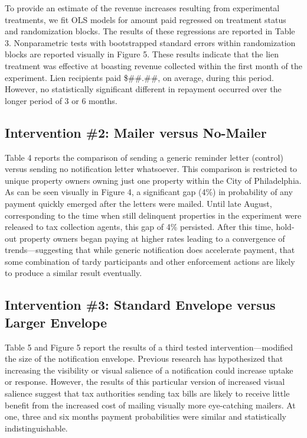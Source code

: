 \documentclass[12pt,titlepage]{article}
\begin{document}
To provide an estimate of the revenue increases resulting from experimental 
treatments, we fit OLS models for amount paid regressed on treatment status 
and randomization blocks. The results of these regressions are reported in 
Table 3. Nonparametric tests with bootstrapped standard errors within 
randomization blocks are reported visually in Figure 5. These results indicate 
that the lien treatment was effective at boasting revenue collected within the 
first month of the experiment. Lien recipients paid \$\#\#.\#\#, on average, 
during this period. However, no statistically significant different in 
repayment occurred over the longer period of 3 or 6 months.

\subsection{Intervention \#2: Mailer versus No-Mailer}

Table 4 reports the comparison of sending a generic reminder letter 
(control) versus sending no notification letter whatsoever. This 
comparison is restricted to unique property owners owning just one 
property within the City of Philadelphia. As can be seen visually in 
Figure 4, a significant gap (4\%) in probability of any payment quickly 
emerged after the letters were mailed. Until late August, corresponding
to the time when still delinquent properties in the experiment were 
released to tax collection agents, this gap of 4\% persisted. 
After this time, hold-out property owners began paying at higher rates 
leading to a convergence of trends—suggesting that while generic 
notification does accelerate payment, that some combination of tardy 
participants and other enforcement actions are likely to produce a 
similar result eventually. 

\subsection{Intervention \#3: Standard Envelope versus Larger Envelope}

Table 5 and Figure 5 report the results of a third tested
intervention—modified the size of the notification envelope.
Previous research has hypothesized that increasing the visibility or visual 
salience of a notification could increase uptake or response.
However, the results of this particular version of increased visual salience 
suggest that tax authorities sending tax bills are likely to receive little 
benefit from the increased cost of mailing visually more eye-catching mailers. 
At one, three and six months payment probabilities were similar and statistically indistinguishable. 
\end{document}
